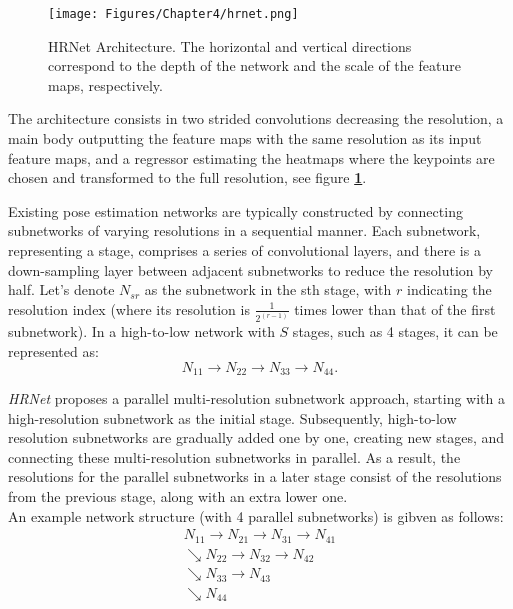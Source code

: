 \begin{figure}[th]
    \centering
    \texttt{[image: Figures/Chapter4/hrnet.png]}
    \caption[HRNet]{HRNet Architecture. The horizontal and vertical directions correspond to the depth of the network and the scale of the feature maps, respectively.}
    \label{fig:HRNet}
\end{figure}

The architecture consists in two strided convolutions decreasing the resolution, a main body outputting the feature maps with the same resolution as its input feature maps, and a regressor estimating the heatmaps where the keypoints are chosen and transformed to the full resolution, see figure \textbf{\ref{fig:HRNet}}.

Existing pose estimation networks are typically constructed by connecting subnetworks of varying resolutions in a sequential manner. Each subnetwork, representing a stage, comprises a series of convolutional layers, and there is a down-sampling layer between adjacent subnetworks to reduce the resolution by half. Let's denote $N_{sr}$ as the subnetwork in the sth stage, with $r$ indicating the resolution index (where its resolution is $\frac{1}{2^{(r-1)}}$ times lower than that of the first subnetwork). In a high-to-low network with $S$ stages, such as 4 stages, it can be represented as:
\begin{equation}
N_{11} \rightarrow N_{22} \rightarrow N_{33} \rightarrow N_{44}.
\end{equation}

\textit{HRNet} proposes a parallel multi-resolution subnetwork approach, starting with a high-resolution subnetwork as the initial stage. Subsequently, high-to-low resolution subnetworks are gradually added one by one, creating new stages, and connecting these multi-resolution subnetworks in parallel. As a result, the resolutions for the parallel subnetworks in a later stage consist of the resolutions from the previous stage, along with an extra lower one.\\
An example network structure (with 4 parallel subnetworks) is gibven as follows:
\begin{equation}
\begin{aligned}
    N_{11} \rightarrow N_{21} \rightarrow N_{31} \rightarrow N_{41}\\
            \searrow N_{22} \rightarrow N_{32} \rightarrow N_{42}\\
            \searrow N_{33} \rightarrow N_{43}\\
            \searrow N_{44}\\
\end{aligned}
\end{equation}

